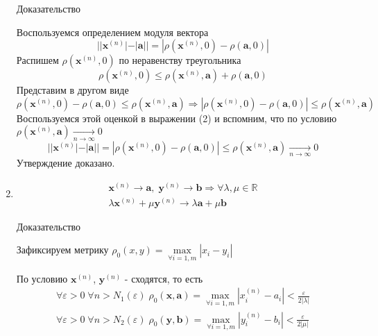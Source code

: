 \begin{enumerate}
  Доказательство
  
  Воспользуемся определением модуля вектора
  \begin{equation}
  ||\textbf {x}^{(n)}| - |\textbf {a}|| = |\rho(\textbf {x}^{(n)}, 0) - \rho(\textbf {a}, 0)|
  \end{equation}
  Распишем $\rho(\textbf {x}^{(n)}, 0)$ по неравенству треугольника
  $$
  \rho(\textbf {x}^{(n)}, 0) \leq \rho(\textbf {x}^{(n)}, \textbf {a}) + \rho(\textbf {a}, 0) 
  $$
  Представим в другом виде
  $$
  \rho(\textbf {x}^{(n)}, 0) - \rho(\textbf {a}, 0) \leq \rho(\textbf {x}^{(n)}, \textbf {a}) \Rightarrow |\rho(\textbf {x}^{(n)}, 0) - \rho(\textbf {a}, 0)| \leq \rho(\textbf {x}^{(n)}, \textbf {a}) 
  $$
  Воспользуемся этой оценкой в выражении (2) и вспомним, что по условию ${\rho(\textbf {x}^{(n)}, \textbf {a}) \underset{n \to \infty}{\longrightarrow} 0}$
  $$
  ||\textbf {x}^{(n)}| - |\textbf {a}|| = |\rho(\textbf {x}^{(n)}, 0) - \rho(\textbf {a}, 0)| \leq \rho(\textbf {x}^{(n)}, \textbf {a}) \underset{n \to \infty}{\longrightarrow} 0
  $$
  Утверждение доказано.
  \item
  \begin{equation*}
  \begin{gathered}
  \textbf {x}^{(n)} \longrightarrow \textbf {a}, \; \textbf {y}^{(n)} \longrightarrow \textbf {b} \Rightarrow \forall \lambda, \mu \in \mathbb {R}\\
  \lambda \textbf {x}^{(n)} + \mu \textbf {y}^{(n)} \longrightarrow \lambda \textbf {a} + \mu \textbf {b}
  \end{gathered}
  \end{equation*}
  
  Доказательство
  
  Зафиксируем метрику $\rho_0(x, y) = \underset{\forall i=1, m}{\max}{|x_i - y_i|}$
  
  По условию $\textbf {x}^{(n)}$, $\textbf {y}^{(n)}$ - сходятся, то есть
  \begin{equation*}
  \begin{gathered}
  \forall \varepsilon > 0 \; \forall n > N_1(\varepsilon) \;\rho_0(\textbf {x}, \textbf {a}) = \underset{\forall i=1, m}{\max}{|{x}^{(n)}_i - {a}_i|} < \frac{\varepsilon}{2|\lambda|}\\
    \forall \varepsilon > 0 \; \forall n > N_2(\varepsilon) \;\rho_0(\textbf {y}, \textbf {b}) = \underset{\forall i=1, m}{\max}{|{y}^{(n)}_i - {b}_i|} < \frac{\varepsilon}{2|\mu|}
  \end{gathered}
  \end{equation*}
  

\end{enumerate}
